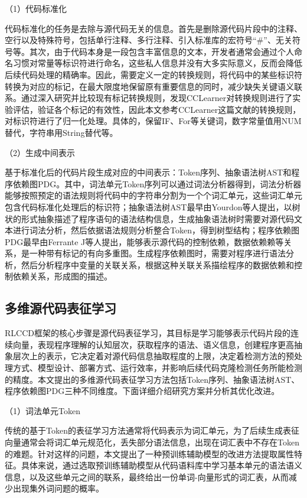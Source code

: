 （1）代码标准化

代码标准化的任务是去除与源代码无关的信息。首先是删除源代码片段中的注释、空行以及特殊符号，包括单行注释、多行注释、引入标准库的宏符号“\#”、无关符号等。其次，由于代码本身是一段包含丰富信息的文本，开发者通常会通过个人命名习惯对常量等标识符进行命名，这些私人信息并没有大多实际意义，反而会降低后续代码处理的精确率。因此，需要定义一定的转换规则，将代码中的某些标识符转换为对应的标记，在最大限度地保留原有重要信息的同时，减少缺失关键语义联系。通过深入研究并比较现有标记转换规则，发现CCLearner\cite{10.1145/1287624.1287634}对转换规则进行了实验评估，验证各个标记的有效性，因此本文参考CCLearner\cite{10.1145/1287624.1287634}这篇文献的转换规则，对标识符进行了归一化处理。具体的，保留IF、For等关键词，数字常量值用NUM替代，字符串用String替代等。


（2）生成中间表示

基于标准化后的代码片段生成对应的中间表示：Token序列、抽象语法树AST和程序依赖图PDG。其中，词法单元Token序列可以通过词法分析器得到，词法分析器能够按照预定的语法规则将代码中的字符串分割为一个个词汇单元，这些词汇单元包含代码标准化处理后的标识符；抽象语法树AST最早由Yourdon等人\cite{10.1145/1499949.1499997}提出，以树状的形式抽象描述了程序语句的语法结构信息，生成抽象语法树时需要对源代码文本进行词法分析，然后依据语法规则分析整合Token，得到树型结构；程序依赖图PDG最早由Ferrante J等人\cite{10.1145/24039.24041}提出，能够表示源代码的控制依赖，数据依赖赖等关系，是一种带有标记的有向多重图。生成程序依赖图时，需要对程序进行语法分析，然后分析程序中变量的关联关系，根据这种关联关系描绘程序的数据依赖和控制依赖关系，形成图的描述。

\subsection{多维源代码表征学习}
\label{subsec:Representation}
RLCCD框架的核心步骤是源代码表征学习，其目标是学习能够表示代码片段的连续向量，表现程序理解的认知层次，获取程序的语法、语义信息，创建程序更高抽象层次上的表示，它决定着对源代码信息抽取程度的上限，决定着检测方法的预处理方式、模型设计、部署方式、运行效率，并影响后续代码克隆检测任务所能检测的精度。本文提出的多维源代码表征学习方法包括Token序列、抽象语法树AST、程序依赖图PDG三种不同维度。下面详细介绍研究方案并分析其优化改进。

（1）词法单元Token

传统的基于Token的表征学习方法通常将代码表示为词汇单元，为了后续生成表征向量通常会将词汇单元规范化，丢失部分语法信息，出现在词汇表中不存在Token的难题。针对这样的问题，本文提出了一种预训练辅助模型的改进方法提取属性特征。具体来说，通过选取预训练辅助模型从代码语料库中学习基本单元的语法语义信息，以及这些单元之间的联系，最终给出一份单词-向量形式的词汇表，从而减少出现集外词问题的概率。

